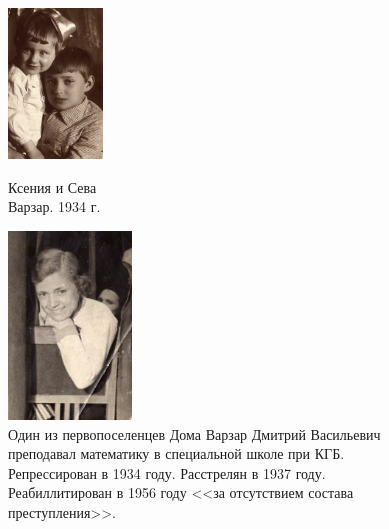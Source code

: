 \documentclass[utf8x, 12pt]{G7-32a} %
\begin{document}
\frontmatter %


\thispagestyle{empty} 

\begin{figure}[h!]
    \caption{Один из первопоселенцев Дома Варзар Дмитрий Васильевич преподавал математику в специальной школе при КГБ. Репрессирован в 1934 году. Расстрелян в 1937 году. Реабиллитирован в 1956 году <<за отсутствием состава преступления>>.}
    \begin{minipage}[h!]{40mm}
         \vspace{10pt}
         \begin{center}
         \vspace{-15pt}
         \includegraphics[height=40mm]{inc/Varzar/11.jpg} 
         \end{center}
         \vspace{-10pt}
         Ксения и Сева \\Варзар. 1934 г.
    \end{minipage}
    \hfill
   \begin{minipage}[h]{55mm}
       \begin{center}
       \includegraphics[height=50mm]{inc/Varzar/12.jpg} 
       \end{center}

\end{minipage}
\end{figure}
\end{document}
